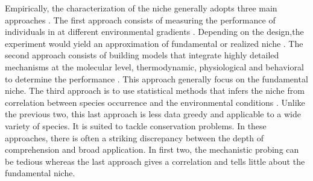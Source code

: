 Empirically, the characterization of the niche generally adopts three main approaches \citep{Holt2009}.
The first approach consists of measuring the performance of  individuals in at different environmental gradients \citep{Birch1953, Elliott1982, Angert2005, Frazier2006}.
Depending on the design,the experiment would yield an approximation of fundamental or realized niche \citep{Birch1953, Elliott1982, Angert2005, Frazier2006}.
The second approach consists of building models that integrate highly detailed mechanisms at the molecular level, thermodynamic, physiological and behavioral to determine  the performance \citep{Kooijman2009, Kearney2009, Buckley2008}.
This approach generally focus on the fundamental niche.
The third approach is to use statistical methods that infers the niche from correlation between species occurrence and the environmental conditions \citep{Guisan2005, Austin2007, Elith2009}. %
Unlike the previous two, this last approach is less data greedy and applicable to a wide variety of species.
It is suited to tackle conservation problems.
In these approaches, there is often a striking discrepancy between the depth of comprehension and broad application.
In first two, the mechanistic probing can be tedious whereas the last approach gives a correlation and tells little about the fundamental niche.

